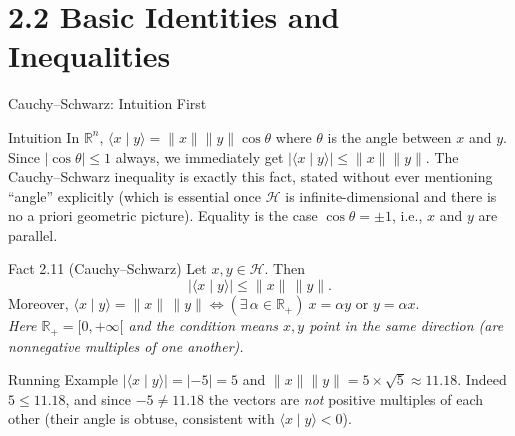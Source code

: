 \documentclass[aspectratio=169,10pt]{beamer}
\newcommand{\R}{\mathbb{R}}
\newcommand{\Hil}{\mathcal{H}}
\newcommand{\ip}[2]{\langle #1 \mid #2 \rangle}
\begin{document}
\section{2.2 Basic Identities and Inequalities}

\begin{frame}{Cauchy--Schwarz: Intuition First}
  \begin{block}{Intuition}
    In $\R^n$, $\ip{x}{y} = \|x\|\|y\|\cos\theta$ where $\theta$ is the angle
    between $x$ and $y$. Since $|\cos\theta| \le 1$ always, we immediately
    get $|\ip{x}{y}| \le \|x\|\|y\|$. The Cauchy--Schwarz inequality is
    exactly this fact, stated without ever mentioning ``angle'' explicitly
    (which is essential once $\Hil$ is infinite-dimensional and there is no
    a priori geometric picture). Equality is the case $\cos\theta = \pm 1$,
    i.e., $x$ and $y$ are parallel.
  \end{block}

  \begin{block}{Fact 2.11 (Cauchy--Schwarz)}
    Let $x, y \in \Hil$. Then
    \[
      |\ip{x}{y}| \le \|x\|\,\|y\|.
    \]
    Moreover, $\ip{x}{y} = \|x\|\,\|y\| \iff (\exists\, \alpha \in \R_+)\
    x = \alpha y \text{ or } y = \alpha x$.
    \\[2pt]
    \textit{Here $\R_+ = [0,+\infty[$ and the condition means $x,y$ point in
    the same direction (are nonnegative multiples of one another).}
  \end{block}

  \begin{exampleblock}{Running Example}
    $|\ip{x}{y}| = |-5| = 5$ and $\|x\|\|y\| = 5 \times \sqrt5 \approx
    11.18$. Indeed $5 \le 11.18$, and since $-5 \ne 11.18$ the vectors are
    \emph{not} positive multiples of each other (their angle is obtuse,
    consistent with $\ip{x}{y}<0$).
  \end{exampleblock}
\end{frame}
\end{document}
